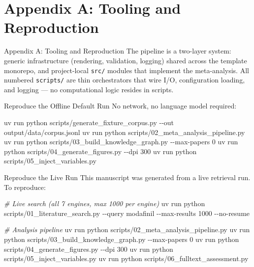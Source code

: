 \documentclass[
  ignorenonframetext,
]{beamer}
\author{\texorpdfstring{}{}}
\date{}
\newenvironment{Shaded}{}{}
\newcommand{\AttributeTok}[1]{\textcolor[rgb]{0.49,0.56,0.16}{#1}}
\newcommand{\CommentTok}[1]{\textcolor[rgb]{0.38,0.63,0.69}{\textit{#1}}}
\newcommand{\ExtensionTok}[1]{#1}
\newcommand{\NormalTok}[1]{#1}
\begin{document}
\section{Appendix A: Tooling and
Reproduction}\label{appendix-a-tooling-and-reproduction}

\begin{frame}{Appendix A: Tooling and
Reproduction}
The pipeline is a two-layer system: generic infrastructure (rendering,
validation, logging) shared across the template monorepo, and
project-local \texttt{src/} modules that implement the meta-analysis.
All numbered \texttt{scripts/} are thin orchestrators that wire I/O,
configuration loading, and logging --- no computational logic resides in
scripts.
\end{frame}

\begin{frame}{Reproduce the Offline Default
Run}
\protect{}\label{reproduce-the-offline-default-run}
No network, no language model required:

\begin{Shaded}
\begin{Highlighting}[]
\ExtensionTok{uv}\NormalTok{ run python scripts/generate\_fixture\_corpus.py }\AttributeTok{{-}{-}out}\NormalTok{ output/data/corpus.jsonl}
\ExtensionTok{uv}\NormalTok{ run python scripts/02\_meta\_analysis\_pipeline.py}
\ExtensionTok{uv}\NormalTok{ run python scripts/03\_build\_knowledge\_graph.py }\AttributeTok{{-}{-}max{-}papers}\NormalTok{ 0}
\ExtensionTok{uv}\NormalTok{ run python scripts/04\_generate\_figures.py }\AttributeTok{{-}{-}dpi}\NormalTok{ 300}
\ExtensionTok{uv}\NormalTok{ run python scripts/05\_inject\_variables.py}
\end{Highlighting}
\end{Shaded}
\end{frame}

\begin{frame}{Reproduce the Live Run}
\protect{}\label{reproduce-the-live-run}
This manuscript was generated from a live retrieval run. To reproduce:

\begin{Shaded}
\begin{Highlighting}[]
\CommentTok{\# Live search (all 7 engines, max 1000 per engine)}
\ExtensionTok{uv}\NormalTok{ run python scripts/01\_literature\_search.py }\AttributeTok{{-}{-}query}\NormalTok{ modafinil }\AttributeTok{{-}{-}max{-}results}\NormalTok{ 1000 }\AttributeTok{{-}{-}no{-}resume}

\CommentTok{\# Analysis pipeline}
\ExtensionTok{uv}\NormalTok{ run python scripts/02\_meta\_analysis\_pipeline.py}
\ExtensionTok{uv}\NormalTok{ run python scripts/03\_build\_knowledge\_graph.py }\AttributeTok{{-}{-}max{-}papers}\NormalTok{ 0}
\ExtensionTok{uv}\NormalTok{ run python scripts/04\_generate\_figures.py }\AttributeTok{{-}{-}dpi}\NormalTok{ 300}
\ExtensionTok{uv}\NormalTok{ run python scripts/05\_inject\_variables.py}
\ExtensionTok{uv}\NormalTok{ run python scripts/06\_fulltext\_assessment.py}
\end{Highlighting}
\end{Shaded}
\end{frame}
\end{document}
